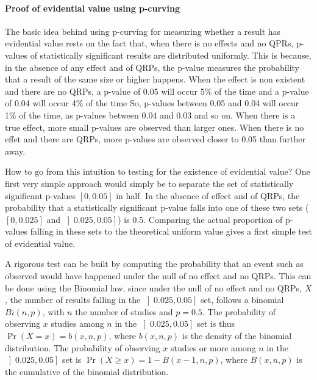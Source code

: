 \documentclass[
]{book}
\theoremstyle{definition}
\theoremstyle{definition}
\theoremstyle{definition}
\theoremstyle{definition}
\theoremstyle{remark}
\begin{document}
\hypertarget{proof-of-evidential-value-using-p-curving}{%
\paragraph{Proof of evidential value using p-curving}\label{proof-of-evidential-value-using-p-curving}}

The basic idea behind using p-curving for measuring whether a result has evidential value rests on the fact that, when there is no effects and no QPRs, p-values of statistically significant results are distributed uniformly.
This is because, in the absence of any effect and of QRPs, the p-value measures the probability that a result of the same size or higher happens.
When the effect is non existent and there are no QRPs, a p-value of 0.05 will occur 5\% of the time and a p-value of 0.04 will occur 4\% of the time
So, p-values between 0.05 and 0.04 will occur 1\% of the time, as p-values between 0.04 and 0.03 and so on.
When there is a true effect, more small p-values are observed than larger ones.
When there is no effet and there are QRPs, more p-values are observed closer to 0.05 than further away.

How to go from this intuition to testing for the existence of evidential value?
One first very simple approach would simply be to separate the set of statistically significant p-values \(\left[0,0.05\right]\) in half.
In the absence of effect and of QRPs, the probability that a statistically significant p-value falls into one of these two sets (\(\left[0,0.025\right]\) and \(\left]0.025,0.05\right]\)) is 0.5.
Comparing the actual proportion of p-values falling in these sets to the theoretical uniform value gives a first simple test of evidential value.

A rigorous test can be built by computing the probability that an event such as observed would have happened under the null of no effect and no QRPs.
This can be done using the Binomial law, since under the null of no effect and no QRPs, \(X\), the number of results falling in the \(\left]0.025,0.05\right]\) set, follows a binomial \(Bi(n,p)\), with \(n\) the number of studies and \(p=0.5\).
The probability of observing \(x\) studies among \(n\) in the \(\left]0.025,0.05\right]\) set is thus \(\Pr(X=x)=b(x,n,p)\), where \(b(x,n,p)\) is the density of the binomial distribution.
The probability of observing \(x\) studies or more among \(n\) in the \(\left]0.025,0.05\right]\) set is \(\Pr(X\geq x)=1-B(x-1,n,p)\), where \(B(x,n,p)\) is the cumulative of the binomial distribution.
\end{document}
